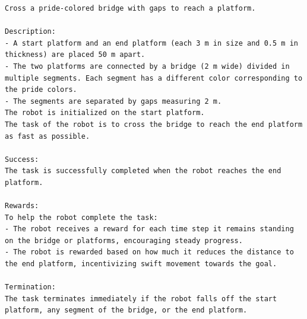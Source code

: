 \begin{lstlisting}[language={}]
Cross a pride-colored bridge with gaps to reach a platform.

Description:
- A start platform and an end platform (each 3 m in size and 0.5 m in thickness) are placed 50 m apart.
- The two platforms are connected by a bridge (2 m wide) divided in multiple segments. Each segment has a different color corresponding to the pride colors.
- The segments are separated by gaps measuring 2 m.
The robot is initialized on the start platform.
The task of the robot is to cross the bridge to reach the end platform as fast as possible.

Success:
The task is successfully completed when the robot reaches the end platform.

Rewards:
To help the robot complete the task:
- The robot receives a reward for each time step it remains standing on the bridge or platforms, encouraging steady progress.
- The robot is rewarded based on how much it reduces the distance to the end platform, incentivizing swift movement towards the goal.

Termination:
The task terminates immediately if the robot falls off the start platform, any segment of the bridge, or the end platform.
\end{lstlisting}

